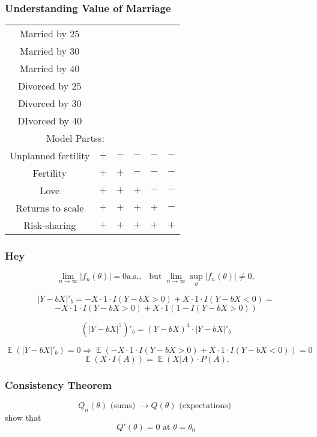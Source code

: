\documentclass{beamer}
\DeclareMathOperator{\E}{\mathbb{E}}
\begin{document}
\begin{frame}
\frametitle{Understanding Value of Marriage}
\begin{tabular}{|c|c|c|c|c|c|}
Married by 25 & \\
Married by 30 & \\
Married by 40 & \\
Divorced by 25 &\\
Divorced by 30 &\\
DIvorced by 40 &\\
\multicolumn{4}{|c|}{Model Partss:}\\
Unplanned fertility & $+$ & $-$ & $-$ & $-$ & $-$ \\
Fertility & $+$ &  $+$ & $-$ & $-$  & $-$ \\
Love & $+$ & $+$ & $+$ & $-$ & $-$ \\
Returns to scale & $+$ & $+$ & $+$ & $+$ & $-$ \\ 
Risk-sharing & $+$ & $+$ & $+$ & $+$ & $+$ \\
\end{tabular}
\end{frame}


\begin{frame}
\frametitle{Hey}
\[\lim\limits_{n\to\infty} |f_n(\theta)| = 0 \text{a.s.}, \ \ \text{ but } \lim\limits_{n\to\infty}\sup_\theta |f_n(\theta)| \neq 0,\]

\[|Y - bX|'_b = -X\cdot 1 \cdot I(Y - bX>0) +X \cdot 1 \cdot I(Y - bX<0)  = \]
\[-X\cdot 1 \cdot I(Y - bX>0) + X\cdot 1 (1 - I(Y - bX>0))\]

\[(|Y - bX|^5)'_b = (Y-bX)^4 \cdot |Y - bX|'_b\]


\[ \E( |Y - bX|'_b ) = 0 \Rightarrow \E( -X\cdot 1 \cdot I(Y - bX>0) +X \cdot 1 \cdot I(Y - bX<0) ) = 0\]
\[ \E(X\cdot I(A) ) = \E(X|A)\cdot P(A).\]

\end{frame}

\begin{frame}
\frametitle{Consistency Theorem}
\[Q_n(\theta) \text{ (sums) } \to Q(\theta)  \text{ (expectations) }\]
show that
\[Q'(\theta) = 0 \text{ at } \theta = \theta_0\]
\end{frame}
\end{document}
